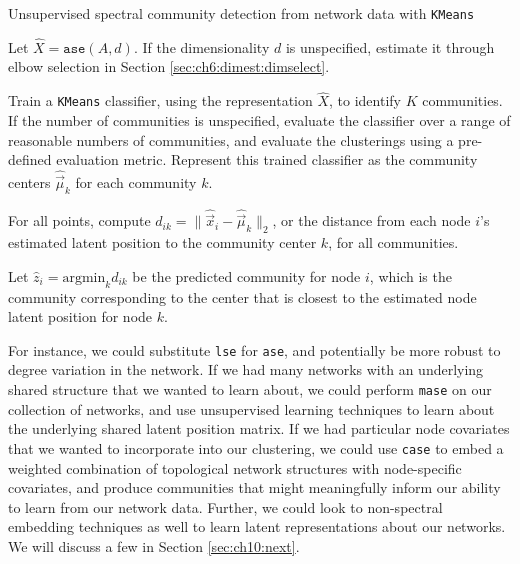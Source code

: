 \begin{algorithm}[h]
\caption{Unsupervised  spectral community detection from network data with \texttt{KMeans}}
\label{alg:ch7:sc}
\SetAlgoLined

Let $\hat X = \texttt{ase}(A, d)$. If the dimensionality $d$ is unspecified, estimate it through elbow selection in Section \ref{sec:ch6:dimest:dimselect}.

Train a \texttt{KMeans} classifier, using the representation $\hat X$, to identify $K$ communities. If the number of communities is unspecified, evaluate the classifier over a range of reasonable numbers of communities, and evaluate the clusterings using a pre-defined evaluation metric. Represent this trained classifier as the community centers $\hat{\vec \mu}_k$ for each community $k$. 

For all points, compute $d_{ik} = \|\hat{\vec x}_i - \hat{\vec \mu}_k\|_2$, or the distance from each node $i$'s estimated latent position to the community center $k$, for all communities.

Let $\hat z_i = \text{argmin}_k d_{ik}$ be the predicted community for node $i$, which is the community corresponding to the center that is closest to the estimated node latent position for node $k$.

\end{algorithm}

For instance, we could substitute \texttt{lse} for \texttt{ase}, and potentially be more robust to degree variation in the network. If we had many networks with an underlying shared structure that we wanted to learn about, we could perform \texttt{mase} on our collection of networks, and use unsupervised learning techniques to learn about the underlying shared latent position matrix. If we had particular node covariates that we wanted to incorporate into our clustering, we could use \texttt{case} to embed a weighted combination of topological network structures with node-specific covariates, and produce communities that might meaningfully inform our ability to learn from our network data. Further, we could look to non-spectral embedding techniques as well to learn latent representations about our networks. We will discuss a few in Section \ref{sec:ch10:next}.

